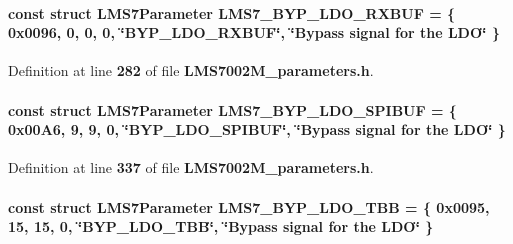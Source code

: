 \paragraph[{L\+M\+S7\+\_\+\+B\+Y\+P\+\_\+\+L\+D\+O\+\_\+\+R\+X\+B\+UF}]{\setlength{\rightskip}{0pt plus 5cm}const struct {\bf L\+M\+S7\+Parameter} L\+M\+S7\+\_\+\+B\+Y\+P\+\_\+\+L\+D\+O\+\_\+\+R\+X\+B\+UF = \{ 0x0096, 0, 0, 0, \char`\"{}\+B\+Y\+P\+\_\+\+L\+D\+O\+\_\+\+R\+X\+B\+U\+F\char`\"{}, \char`\"{}\+Bypass signal for the L\+D\+O\char`\"{} \}\hspace{0.3cm}{\ttfamily [static]}}\label{LMS7002M__parameters_8h_acca470951901f2ec85f26c8cefa41f3e}


Definition at line {\bf 282} of file {\bf L\+M\+S7002\+M\+\_\+parameters.\+h}.

\paragraph[{L\+M\+S7\+\_\+\+B\+Y\+P\+\_\+\+L\+D\+O\+\_\+\+S\+P\+I\+B\+UF}]{\setlength{\rightskip}{0pt plus 5cm}const struct {\bf L\+M\+S7\+Parameter} L\+M\+S7\+\_\+\+B\+Y\+P\+\_\+\+L\+D\+O\+\_\+\+S\+P\+I\+B\+UF = \{ 0x00\+A6, 9, 9, 0, \char`\"{}\+B\+Y\+P\+\_\+\+L\+D\+O\+\_\+\+S\+P\+I\+B\+U\+F\char`\"{}, \char`\"{}\+Bypass signal for the L\+D\+O\char`\"{} \}\hspace{0.3cm}{\ttfamily [static]}}\label{LMS7002M__parameters_8h_a2f430fbab508cafd915dc609b7d9db02}


Definition at line {\bf 337} of file {\bf L\+M\+S7002\+M\+\_\+parameters.\+h}.

\paragraph[{L\+M\+S7\+\_\+\+B\+Y\+P\+\_\+\+L\+D\+O\+\_\+\+T\+BB}]{\setlength{\rightskip}{0pt plus 5cm}const struct {\bf L\+M\+S7\+Parameter} L\+M\+S7\+\_\+\+B\+Y\+P\+\_\+\+L\+D\+O\+\_\+\+T\+BB = \{ 0x0095, 15, 15, 0, \char`\"{}\+B\+Y\+P\+\_\+\+L\+D\+O\+\_\+\+T\+B\+B\char`\"{}, \char`\"{}\+Bypass signal for the L\+D\+O\char`\"{} \}\hspace{0.3cm}{\ttfamily [static]}}\label{LMS7002M__parameters_8h_ac24e7734959c3675ce06d8559309005a}


